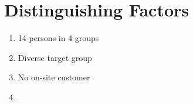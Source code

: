 \documentclass{article}
\begin{document}
\section{Distinguishing Factors}

\begin{enumerate}
	\item 14 persons in 4 groups
	\item Diverse target group
	\item No on-site customer
	\item 
\end{enumerate}
\end{document}
